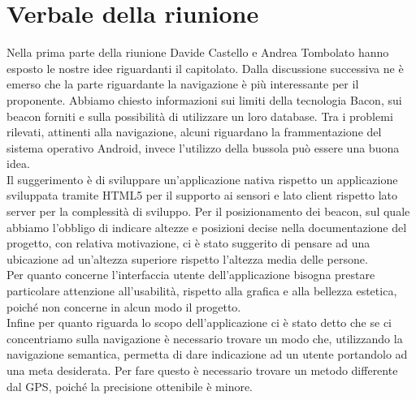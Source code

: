\documentclass[../Riunione2015-12-21.tex]{subfiles}
\begin{document}
\section{Verbale della riunione}
Nella prima parte della riunione Davide Castello e Andrea Tombolato hanno esposto le nostre idee riguardanti il capitolato. Dalla discussione successiva ne è emerso che la parte riguardante la navigazione è più interessante per il proponente. Abbiamo chiesto informazioni sui limiti della tecnologia Bacon, sui beacon forniti e sulla possibilità di utilizzare un loro database. 
Tra i problemi rilevati, attinenti alla navigazione, alcuni riguardano la frammentazione del sistema operativo Android, invece l'utilizzo della bussola può essere una buona idea. \\ Il suggerimento è di sviluppare un'applicazione nativa rispetto un applicazione sviluppata tramite HTML5 per il supporto ai sensori e lato client rispetto lato server per la complessità di sviluppo.
Per il posizionamento dei beacon, sul quale abbiamo l'obbligo di indicare altezze e posizioni decise nella documentazione del progetto, con relativa motivazione, ci è stato suggerito di pensare ad una ubicazione ad un'altezza superiore rispetto l'altezza media delle persone. \\
Per quanto concerne l'interfaccia utente dell'applicazione bisogna prestare particolare attenzione all'usabilità, rispetto alla grafica e alla bellezza estetica, poiché non concerne in alcun modo il progetto. \\
Infine per quanto riguarda lo scopo dell'applicazione ci è stato detto che se ci concentriamo sulla navigazione è necessario trovare un modo che, utilizzando la navigazione semantica, permetta di dare indicazione ad un utente portandolo ad una meta desiderata. Per fare questo è necessario trovare un metodo differente dal GPS, poiché la precisione ottenibile è minore.
\end{document}
